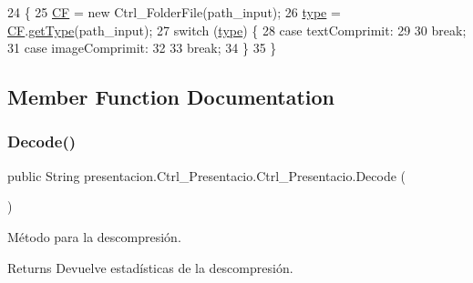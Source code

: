 \begin{DoxyCode}
24                                                \{
25         \hyperlink{classpresentacion_1_1Ctrl__Presentacio_1_1Ctrl__Presentacio_af46ef2ef420276ff830c2f0ff8c1a7e6}{CF} = \textcolor{keyword}{new} Ctrl\_FolderFile(path\_input);
26         \hyperlink{classpresentacion_1_1Ctrl__Presentacio_1_1Ctrl__Presentacio_af72267ee1302df6b5982c3248d5a19b0}{type} = \hyperlink{classpresentacion_1_1Ctrl__Presentacio_1_1Ctrl__Presentacio_af46ef2ef420276ff830c2f0ff8c1a7e6}{CF}.\hyperlink{classdomini_1_1folders_1_1Ctrl__FolderFile_a9e2ef751bdcb99083831c6b4e4761169}{getType}(path\_input);
27         \textcolor{keywordflow}{switch} (\hyperlink{classpresentacion_1_1Ctrl__Presentacio_1_1Ctrl__Presentacio_af72267ee1302df6b5982c3248d5a19b0}{type}) \{
28             \textcolor{keywordflow}{case} textComprimit:
29 
30                 \textcolor{keywordflow}{break};
31             \textcolor{keywordflow}{case} imageComprimit:
32 
33                 \textcolor{keywordflow}{break};
34         \}
35     \}
\end{DoxyCode}


\subsection{Member Function Documentation}
\mbox{\label{classpresentacion_1_1Ctrl__Presentacio_1_1Ctrl__Presentacio_adc652f63ed7619207a94a3a58b6bdd77}} 
\subsubsection{\texorpdfstring{Decode()}{Decode()}}
{\footnotesize\ttfamily public String presentacion.\+Ctrl\+\_\+\+Presentacio.\+Ctrl\+\_\+\+Presentacio.\+Decode (\begin{DoxyParamCaption}{ }\end{DoxyParamCaption})\hspace{0.3cm}{\ttfamily [inline]}}



Método para la descompresión. 

\begin{DoxyReturn}{Returns}
Devuelve estadísticas de la descompresión. 
\end{DoxyReturn}

